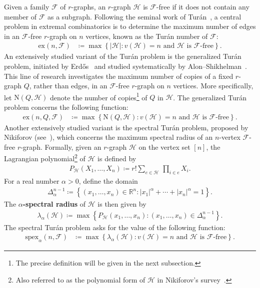 \documentclass[11pt,a4paper]{article}
\begin{document}
Given a family $\mathcal{F}$ of $r$-graphs, an $r$-graph $\mathcal{H}$ is $\mathcal{F}$-free if it does not contain any member of $\mathcal{F}$ as a subgraph. 
Following the seminal work of Tur\'{a}n~\cite{TU41}, a central problem in extremal combinatorics is to determine the maximum number of edges in an $\mathcal{F}$-free $r$-graph on $n$ vertices, known as the Tur\'{a}n number of $\mathcal{F}$:
\begin{align*}
    \mathrm{ex}(n,\mathcal{F})
    & \coloneqq \max\left\{ |\mathcal{H}| \colon \text{$v(\mathcal{H}) = n$ and $\mathcal{H}$ is $\mathcal{F}$-free}\right\}.
\end{align*}
%
An extensively studied variant of the Tur\'{a}n problem is the generalized Tur\'{a}n problem, initiated by Erd\H{o}s~\cite{Erdos62} and studied systematically by Alon--Shikhelman~\cite{AS16}. 
This line of research investigates the maximum number of copies of a fixed $r$-graph $Q$, rather than edges, in an $\mathcal{F}$-free $r$-graph on $n$ vertices.
More specifically, let $\mathrm{N}(Q,\mathcal{H})$ denote the number of copies\footnote{The precise definition will be given in the next subsection.} of $Q$ in $\mathcal{H}$. The generalized Tur\'{a}n problem concerns the following function:
\begin{align*}
    \mathrm{ex}(n, Q, \mathcal{F})
    & \coloneqq \max\left\{ \mathrm{N}(Q,\mathcal{H}) \colon \text{$v(\mathcal{H}) = n$ and $\mathcal{H}$ is $\mathcal{F}$-free}\right\}.
\end{align*}
%
Another extensively studied variant is the spectral Tur\'{a}n problem, proposed by Nikiforov (see~\cite{BS86,Nik07,Nik10}), which concerns the maximum spectral radius of an $n$-vertex $\mathcal{F}$-free $r$-graph.
Formally, given an $r$-graph $\mathcal{H}$ on the vertex set $[n]$, the Lagrangian polynomial\footnote{Also referred to as the polynomial form of $\mathcal{H}$ in Nikiforov’s survey~\cite{Nik14}.} of $\mathcal{H}$ is defined by
\begin{align}\label{equ:Lagrangian-polynomial}
    P_{\mathcal{H}}(X_1, \ldots, X_n)
    \coloneqq r! \sum_{e \in \mathcal{H}} \, \prod_{i \in e} X_i.
\end{align}
%
For a real number $\alpha > 0$, define the domain
\begin{align*}
    \Delta^{n-1}_{\alpha}
    \coloneqq 
    \left\{(x_1, \ldots, x_{n}) \in \mathbb{R}^n \colon |x_{1}|^{\alpha} + \cdots + |x_{n}|^{\alpha} = 1 \right\}.
\end{align*}
%
The \textbf{$\alpha$-spectral radius} of $\mathcal{H}$ is then given by  
\begin{align*}
    \lambda_{\alpha}(\mathcal{H})
    \coloneqq \max\left\{P_{\mathcal{H}}(x_1, \ldots, x_{n}) \colon (x_1, \ldots, x_{n}) \in \Delta^{n-1}_{\alpha} \right\}. 
\end{align*}
%
The spectral Tur\'{a}n problem asks for the value of the following function:
\begin{align*}
    \mathrm{spex}_{\alpha}(n,\mathcal{F})
    & \coloneqq \max\left\{\lambda_{\alpha}(\mathcal{H}) \colon \text{$v(\mathcal{H}) = n$ and $\mathcal{H}$ is $\mathcal{F}$-free}\right\}. 
\end{align*}
%
\end{document}
